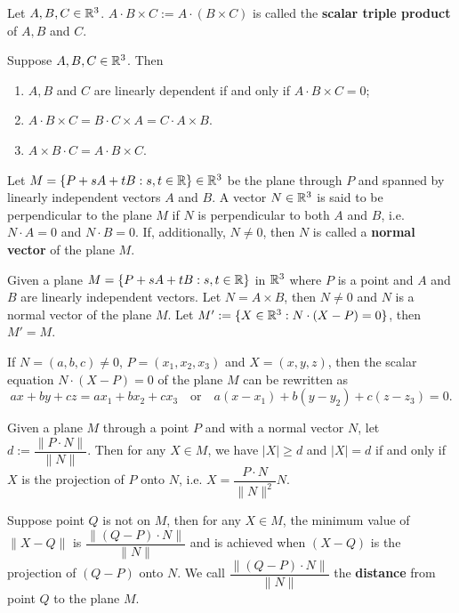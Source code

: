 \documentclass[a4paper]{ctexart}
\begin{document}
    \begin{mydef}
        Let $A,B,C\in \mathbb{R}^3$. $A\cdot B \times C := A\cdot (B\times C)$ is called the \textbf{scalar triple product} of $A,B$ and $C$.
    \end{mydef}
    \begin{mythm}
        Suppose $A,B,C\in \mathbb{R}^3$. Then
        \begin{enumerate}[label=(\arabic*)]
            \item $A,B$ and $C$ are linearly dependent if and only if $A\cdot B \times C = 0$;
            \item $A \cdot B \times C = B \cdot C \times A = C \cdot A \times B$.
            \item $A \times B \cdot C = A \cdot B \times C$.
        \end{enumerate}
    \end{mythm}
    \begin{mydef}
        Let $M = \{ P + sA + tB : s,t\in \mathbb{R}\} \in \mathbb{R}^3$ be the plane through $P$ and spanned by linearly independent vectors $A$ and $B$. A vector $N \in \mathbb{R}^3$ is said to be perpendicular to the plane $M$ if $N$ is perpendicular to both $A$ and $B$, i.e. $N\cdot A = 0$ and $N\cdot B = 0$. If, additionally, $N\ne 0$, then $N$ is called a \textbf{normal vector} of the plane $M$.
    \end{mydef}
    \begin{mythm}
        Given a plane $M = \{ P + sA + tB : s,t\in \mathbb{R}\}$ in $\mathbb{R}^3$ where $P$ is a point and $A$ and $B$ are linearly independent vectors. Let $N=A\times B$, then $N \ne 0 $ and $N$ is a normal vector of the plane $M$. Let $M' := \{ X\in \mathbb{R}^3 : N\cdot (X-P) = 0\}$, then $M' = M$.
    \end{mythm}
    \begin{myrmk}
        If $N=(a,b,c) \ne 0$, $P=(x_1,x_2,x_3)$ and $X=(x,y,z)$, then the scalar equation $N\cdot (X-P) = 0$ of the plane $M$ can be rewritten as
        \[
        ax + by + cz = ax_1 + bx_2 + cx_3 \quad \text{or} \quad a(x-x_1) + b(y-y_2) + c(z-z_3) = 0.
        \]
    \end{myrmk}
    \begin{mythm}
        Given a plane $M$ through a point $P$ and with a normal vector $N$, let $d:= \dfrac{\|P\cdot N\|}{\|N\|}$. Then for any $X\in M$, we have $|X| \ge d$ and $|X| = d$ if and only if $X$ is the projection of $P$ onto $N$, i.e. $X = \dfrac{P\cdot N}{\|N\|^2} N$.
    \end{mythm}
    \begin{myrmk}
        Suppose point $Q$ is not on $M$, then for any $X\in M$, the minimum value of $\| X-Q\|$ is $\dfrac{\| (Q-P)\cdot N \|}{\|N\|}$ and is achieved when $(X-Q)$ is the projection of $(Q-P)$ onto $N$. We call $\dfrac{\| (Q-P)\cdot N \|}{\|N\|}$ the \textbf{distance} from point $Q$ to the plane $M$.
    \end{myrmk}
\end{document}
